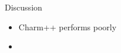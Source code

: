 \begin{block}{Discussion}

\begin{itemize}
\item Charm++ performs poorly
\item 
\end{itemize}

\end{block}
